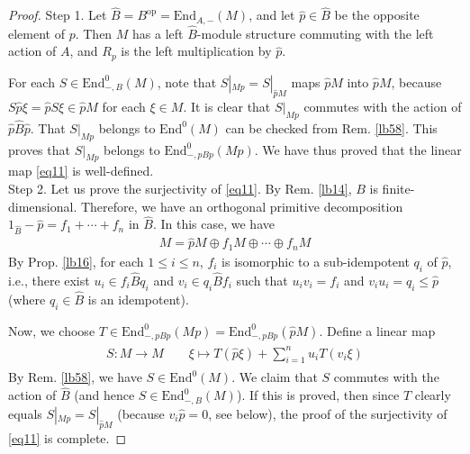 \documentclass[11pt,b5paper,notitlepage]{article}
\theoremstyle{definition}
\theoremstyle{plain}
\newcommand{\wht}{\widehat}
\newcommand{\End}{\mathrm{End}} %
\newcommand{\opp}{\mathrm{op}}
\numberwithin{equation}{section}
\begin{document}
\begin{proof}
Step 1. Let $\wht B=B^\opp=\End_{A,-}(M)$, and let $\wht p\in\wht B$ be the opposite element of $p$. Then $M$ has a left $\wht B$-module structure commuting with the left action of $A$, and $R_p$ is the left multiplication by $\wht p$.

For each $S\in\End^0_{-,B}(M)$, note that $S|_{Mp}=S|_{\wht pM}$ maps $\wht pM$ into $\wht pM$, because $S\wht p\xi=\wht pS\xi\in\wht pM$ for each $\xi\in M$. It is clear that $S|_{Mp}$ commutes with the action of $\wht p\wht B\wht p$. That $S|_{Mp}$ belongs to $\End^0(M)$ can be checked from Rem. \ref{lb58}. This proves that $S|_{Mp}$ belongs to $\End^0_{-,pBp}(Mp)$. We have thus proved that the linear map \eqref{eq11} is well-defined.\\[-1ex]

Step 2. Let us prove the surjectivity of \eqref{eq11}. By Rem. \ref{lb14}, $B$ is finite-dimensional. Therefore, we have an orthogonal primitive decomposition $1_{\wht B}-\wht p=f_1+\cdots +f_n$ in $\wht B$. In this case, we have 
\begin{align*}
M=\wht pM\oplus f_1 M \oplus \cdots \oplus f_n M
\end{align*}
By Prop. \ref{lb16}, for each $1\leq i\leq n$, $f_i$ is isomorphic to a sub-idempotent $q_i$ of $\wht p$, i.e., there exist $u_i\in f_i\wht B q_i$ and $v_i\in q_i\wht B f_i$ such that $u_iv_i=f_i$ and $v_iu_i=q_i\leq \wht p$ (where $q_i\in\wht B$ is an idempotent). 



Now, we choose $T\in\End_{-,pBp}^0(Mp)=\End_{-,pBp}^0(\wht pM)$. Define a linear map 
	\begin{gather}\label{eq12}
	\begin{gathered}
		S:M\rightarrow M\qquad
		\xi\mapsto T(\wht p\xi)+\sum_{i=1}^n u_i T(v_i\xi)
	\end{gathered}
\end{gather}
By Rem. \ref{lb58}, we have $S\in\End^0(M)$. We claim that $S$ commutes with the action of $\wht B$ (and hence $S\in \End_{-,B}^0(M)$). If this is proved, then since $T$ clearly equals $S|_{Mp}=S|_{\wht pM}$ (because $v_i\wht p=0$, see below), the proof of the surjectivity of \eqref{eq11} is complete.


\end{proof}
\end{document}
